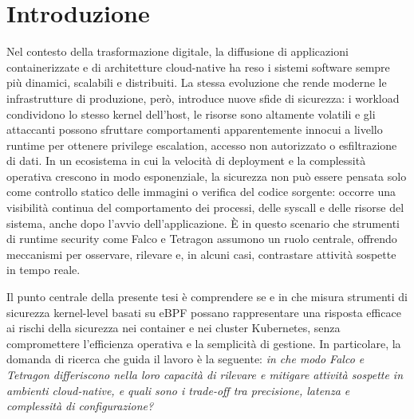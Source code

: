 \documentclass[12pt,a4paper,openright,twoside]{book}
\begin{document}

{
\hypersetup{linkcolor=black}
\tableofcontents   
\listoffigures
\lstlistoflistings
}


\mainmatter


\chapter{Introduzione}
\label{chap:introduction}

Nel contesto della trasformazione digitale, la diffusione di applicazioni containerizzate e di architetture cloud-native ha reso i sistemi software sempre più dinamici, scalabili e distribuiti. La stessa evoluzione che rende moderne le infrastrutture di produzione, però, introduce nuove sfide di sicurezza: i workload condividono lo stesso kernel dell'host, le risorse sono altamente volatili e gli attaccanti possono sfruttare comportamenti apparentemente innocui a livello runtime per ottenere privilege escalation, accesso non autorizzato o esfiltrazione di dati. In un ecosistema in cui la velocità di deployment e la complessità operativa crescono in modo esponenziale, la sicurezza non può essere pensata solo come controllo statico delle immagini o verifica del codice sorgente: occorre una visibilità continua del comportamento dei processi, delle syscall e delle risorse del sistema, anche dopo l'avvio dell'applicazione. È in questo scenario che strumenti di runtime security come Falco e Tetragon assumono un ruolo centrale, offrendo meccanismi per osservare, rilevare e, in alcuni casi, contrastare attività sospette in tempo reale.

Il punto centrale della presente tesi è comprendere se e in che misura strumenti di sicurezza kernel-level basati su eBPF possano rappresentare una risposta efficace ai rischi della sicurezza nei container e nei cluster Kubernetes, senza compromettere l'efficienza operativa e la semplicità di gestione. In particolare, la domanda di ricerca che guida il lavoro è la seguente: \emph{in che modo Falco e Tetragon differiscono nella loro capacità di rilevare e mitigare attività sospette in ambienti cloud-native, e quali sono i trade-off tra precisione, latenza e complessità di configurazione?}
\end{document}
